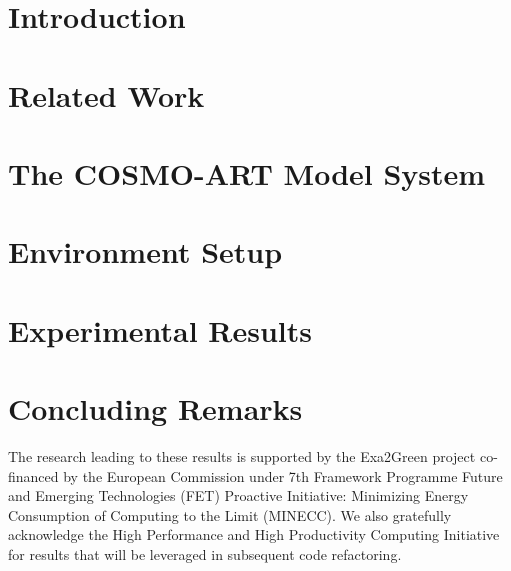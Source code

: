 \documentclass[twocolumn]{svjour3}
\DeclareRobustCommand\IPCClongname{}
\begin{document}
\section{Introduction}
\label{intro}


\section{Related Work}
\label{sec:1}


\section{The \textsc{COSMO-ART} Model System}
\label{sec:2}


\section{Environment Setup}
\label{sec:3}


\section{Experimental Results}
\label{sec:4}


\section{Concluding Remarks}
\label{concl}



\begin{acknowledgements}
The research  leading to these  results is supported by  the Exa2Green
project  co-financed by  the European  Commission under  7th Framework
Programme Future and Emerging Technologies (FET) Proactive Initiative:
Minimizing Energy  Consumption of Computing to the  Limit (MINECC). We
also gratefully acknowledge the High Performance and High Productivity
Computing Initiative  \cite{HP2C} for results that  will be leveraged
in subsequent code refactoring.
\end{acknowledgements}

\DeclareRobustCommand\IPCClongname{ - Intergovernmental Panel on Climate Change}



\end{document}
